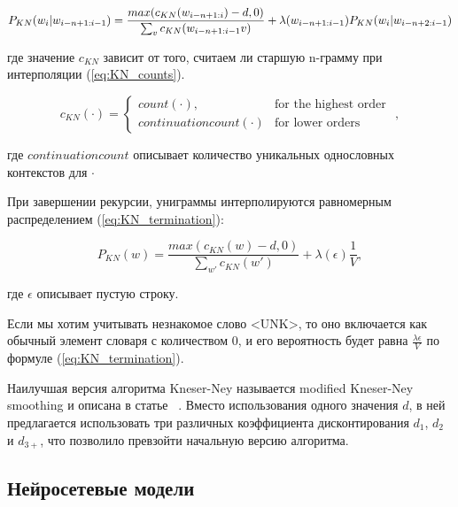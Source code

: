 \begin{equation}
	P_{KN}(w_i|w_{i-n+1:i-1}) = \frac{max(c_{KN}(w_{i-n+1:i})-d, 0)}{\sum_v{c_{KN}(w_{i-n+1:i-1}v)}} + \\ \lambda(w_{i-n+1:i-1})P_{KN}(w_i|w_{i-n+2:i-1})
	\label{eq:i_actualy_once_coded_this_shit}
\end{equation}
\begin{explanation}
	где значение $c_{KN}$ зависит от того, считаем ли старшую n-грамму при \\ интерполяции (\ref{eq:KN_counts}).
\end{explanation}
\begin{equation}
	c_{KN}(\cdot) = \begin{cases} 
		count(\cdot), & \mbox{for the highest order }\\ 
		continuationcount(\cdot) & \mbox{for lower orders}
	\end{cases},
	\label{eq:KN_counts}
\end{equation}
\begin{explanation}
	где $continuationcount$ описывает количество уникальных однословных \\ контекстов для $\cdot$
\end{explanation}

При завершении рекурсии, униграммы интерполируются равномерным распределением (\ref{eq:KN_termination}):

\begin{equation}
	P_{KN}(w) = \frac{max(c_{KN}(w) - d, 0)}{\sum_{w'}{c_{KN}(w')}} + \lambda(\epsilon)\frac{1}{V},
	\label{eq:KN_termination}
\end{equation}
\begin{explanation}
	где $\epsilon$ описывает пустую строку.
\end{explanation}

Если мы хотим учитывать незнакомое слово $\text{<UNK>}$, то оно включается как обычный элемент словаря с количеством 0, и его вероятность будет равна $\frac{\lambda{\epsilon}}{V}$ по формуле (\ref{eq:KN_termination}).

Наилучшая версия алгоритма Kneser-Ney называется modified Kneser-Ney smoothing и описана в статье ~\cite{modified-kneser-ney}. Вместо использования одного значения $d$, в ней предлагается использовать три различных коэффициента дисконтирования $d_1$, $d_2$ и $d_{3+}$, что позволило превзойти начальную версию алгоритма. ~\cite{n_grams}

\subsection{Нейросетевые модели}
\label{sub:domain:neural}

